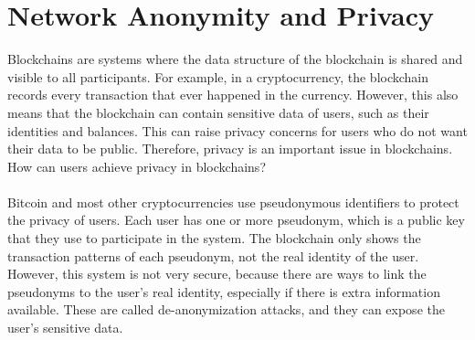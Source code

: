 \documentclass{report}
\begin{document}
\section{Network Anonymity and Privacy}
Blockchains are systems where the data structure of the blockchain is shared and visible to all participants. For example, in a cryptocurrency, the blockchain records every transaction that ever happened in the currency. However, this also means that the blockchain can contain sensitive data of users, such as their identities and balances. This can raise privacy concerns for users who do not want their data to be public. Therefore, privacy is an important issue in blockchains. How can users achieve privacy in blockchains?\\\\
Bitcoin and most other cryptocurrencies use pseudonymous identifiers to protect the privacy of users. Each user has one or more pseudonym, which is a public key that they use to participate in the system. The blockchain only shows the transaction patterns of each pseudonym, not the real identity of the user. However, this system is not very secure, because there are ways to link the pseudonyms to the user’s real identity, especially if there is extra information available. These are called de-anonymization attacks, and they can expose the user’s sensitive data.
\end{document}
